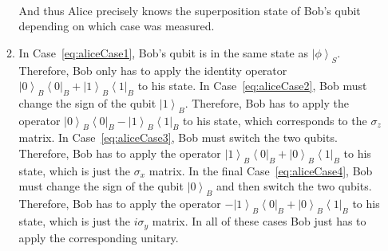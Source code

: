 \documentclass[12pt,a4]{article}
\begin{document}
\begin{enumerate}
\begin{enumerate}
\begin{align}
        \end{align}
        And thus Alice precisely knows the superposition state of Bob's qubit depending on which case was measured.
      \item
        In Case~\ref{eq:aliceCase1}, Bob's qubit is in the same state as $\left|\phi\right\rangle_S$.
        Therefore, Bob only has to apply the identity operator $\left|0\right\rangle_B\left\langle 0 \right|_B + \left|1\right\rangle_B\left\langle 1 \right|_B$ to his state.
        In Case~\ref{eq:aliceCase2}, Bob must change the sign of the qubit $\left|1\right\rangle_B$.
        Therefore, Bob has to apply the operator $\left|0\right\rangle_B\left\langle 0 \right|_B - \left|1\right\rangle_B\left\langle 1 \right|_B$ to his state, which corresponds to the $\sigma_z$ matrix.
        In Case~\ref{eq:aliceCase3}, Bob must switch the two qubits.
        Therefore, Bob has to apply the operator $\left|1\right\rangle_B\left\langle 0 \right|_B + \left|0\right\rangle_B\left\langle 1 \right|_B$ to his state, which is just the $\sigma_x$ matrix.
        In the final Case~\ref{eq:aliceCase4}, Bob must change the sign of the qubit $\left|0\right\rangle_B$ and then switch the two qubits.
        Therefore, Bob has to apply the operator $-\left|1\right\rangle_B\left\langle 0 \right|_B + \left|0\right\rangle_B\left\langle 1 \right|_B$ to his state, which is just the $i\sigma_y$ matrix.
        In all of these cases Bob just has to apply the corresponding unitary.
    \end{enumerate}
\end{enumerate}
\end{document}

